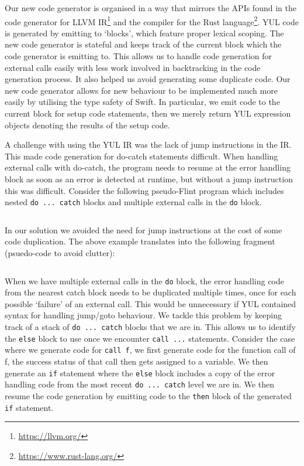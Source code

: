 Our new code generator is organised in a way that mirrors the APIs found in the code generator for LLVM IR\footnote{\url{https://llvm.org/}} and the compiler for the Rust language\footnote{\url{https://www.rust-lang.org/}}. YUL code is generated by emitting to `blocks', which feature proper lexical scoping. The new code generator is stateful and keeps track of the current block which the code generator is emitting to. This allows us to handle code generation for external calls easily with less work involved in backtracking in the code generation process. It also helped us avoid generating some duplicate code. Our new code generator allows for new behaviour to be implemented much more easily by utilising the type safety of Swift. In particular, we emit code to the current block for setup code statements, then we merely return YUL expression objects denoting the results of the setup code. 

A challenge with using the YUL IR was the lack of jump instructions in the IR. This made code generation for do-catch statements difficult. When handling external calls with do-catch, the program needs to resume at the error handling block as soon as an error is detected at runtime, but without a jump instruction this was difficult. Consider the following pseudo-Flint program which includes nested \texttt{do ... catch} blocks and multiple external calls in the \texttt{do} block.

\inputminted{swift}{code/do-catch-1.flint}

In our solution we avoided the need for jump instructions at the cost of some code duplication. The above example translates into the following fragment (psuedo-code to avoid clutter):

\inputminted{swift}{code/do-catch-2.flint}

When we have multiple external calls in the \texttt{do} block, the error handling code from the nearest catch block needs to be duplicated multiple times, once for each possible `failure' of an external call. This would be unnecessary if YUL contained syntax for handling jump/goto behaviour. We tackle this problem by keeping track of a stack of \texttt{do ... catch} blocks that we are in. This allows us to identify the \texttt{else} block to use once we encounter \texttt{call ...} statements. Consider the case where we generate code for \texttt{call f}, we first generate code for the function call of f, the success status of that call then gets assigned to a variable. We then generate an \texttt{if} statement where the \texttt{else} block includes a copy of the error handling code from the most recent \texttt{do ... catch} level we are in. We then resume the code generation by emitting code to the \texttt{then} block of the generated \texttt{if} statement.


